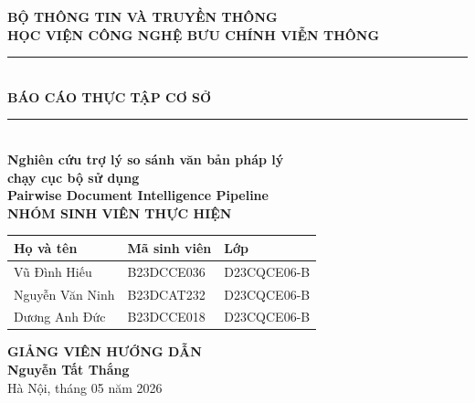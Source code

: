 \documentclass[12pt, a4paper]{report}
\begin{document}
\thispagestyle{empty}

\begin{center}

{\fontsize{14}{16}\selectfont \textbf{BỘ THÔNG TIN VÀ TRUYỀN THÔNG}}\\[0.3cm]
{\fontsize{14}{16}\selectfont \textbf{HỌC VIỆN CÔNG NGHỆ BƯU CHÍNH VIỄN THÔNG}}\\[0.5cm]

\vspace{0.5cm}
\vspace{0.5cm}

\rule{\linewidth}{2pt}\\[1.5cm]

{\fontsize{18}{20}\selectfont \textbf{BÁO CÁO THỰC TẬP CƠ SỞ}}\\[1.5cm]

\rule{\linewidth}{1pt}\\[1.5cm]

{\fontsize{16}{18}\selectfont \textbf{Nghiên cứu trợ lý so sánh văn bản pháp lý}}\\[0.3cm]
{\fontsize{16}{18}\selectfont \textbf{chạy cục bộ sử dụng}}\\[0.3cm]
{\fontsize{16}{18}\selectfont \textbf{Pairwise Document Intelligence Pipeline}}\\[2cm]

{\fontsize{14}{16}\selectfont \textbf{NHÓM SINH VIÊN THỰC HIỆN}}\\[1cm]

\begin{tabular}{lll}
    \textbf{Họ và tên} & \textbf{Mã sinh viên} & \textbf{Lớp}\\
    \hline
    Vũ Đình Hiếu & B23DCCE036 & D23CQCE06-B\\
    Nguyễn Văn Ninh & B23DCAT232 & D23CQCE06-B\\
    Dương Anh Đức & B23DCCE018 & D23CQCE06-B\\
\end{tabular}

\vspace{1.5cm}

{\fontsize{14}{16}\selectfont \textbf{GIẢNG VIÊN HƯỚNG DẪN}}\\[0.5cm]
{\fontsize{14}{16}\selectfont \textbf{Nguyễn Tất Thắng}}\\[2cm]

{\fontsize{12}{14}\selectfont Hà Nội, tháng 05 năm 2026}

\end{center}
\end{document}
